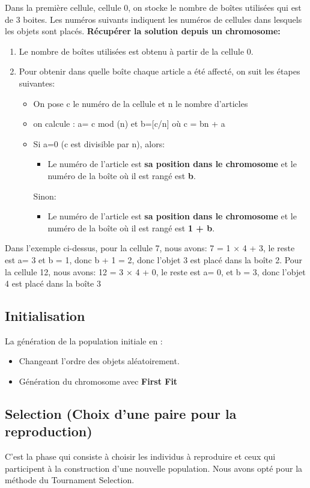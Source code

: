 \documentclass{report}
\begin{document}
\newline
Dans la première cellule, cellule 0, on stocke le nombre de boîtes utilisées qui est de  3 boites. Les numéros suivants indiquent les numéros de cellules dans lesquels les objets sont placés.
\newline
\newline
\textbf{Récupérer la solution depuis un chromosome: }
\begin{enumerate}
	\item Le nombre de boîtes utilisées est obtenu à partir de la cellule 0. 
	\item Pour obtenir dans quelle boîte chaque article a été affecté, on suit les étapes suivantes: 
	\begin{itemize}
		\item On pose c le numéro de la cellule et n le nombre d’articles
		\item on calcule : a= c mod (n) et b=[c/n] où c = bn + a
		\item  Si a=0  (c est divisible par n), alors: 
		\begin{itemize}
			\item Le numéro de l’article est\textbf{ sa position dans le chromosome} et le numéro de la boîte où il est rangé  est \textbf{b}.
		\end{itemize}
		Sinon:
		\begin{itemize}
			\item Le numéro de l’article est \textbf{sa position dans le chromosome} et le numéro de la boîte où il est rangé est \textbf{1 + b}.
		\end{itemize}
	\end{itemize}
\end{enumerate}
Dans l'exemple ci-dessus, pour la cellule 7, nous avons: 7 = 1 × 4 + 3, 
le reste est a= 3 et b = 1, donc b + 1 = 2, donc l'objet 3 est placé dans la boîte 2. 
Pour la cellule 12, nous avons: 12 = 3 × 4 + 0, le reste est a= 0, et b = 3, donc l'objet 4 est placé dans la boîte 3
\subsection{Initialisation}
La génération de la population initiale en :
		\begin{itemize}
			\item Changeant l’ordre des objets aléatoirement.
			\item Génération du chromosome avec \textbf{First Fit}
		\end{itemize}
\subsection{Selection (Choix d'une paire pour la reproduction)}
C’est la phase qui consiste à choisir les individus à reproduire et ceux qui participent à la construction d’une nouvelle population. Nous avons opté pour la méthode du Tournament Selection.
\end{document}
